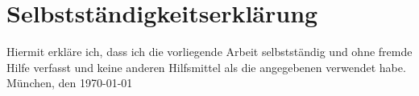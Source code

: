 \chapter*{Selbstständigkeitserklärung}

Hiermit erkläre ich, dass ich die vorliegende Arbeit selbstständig und ohne fremde Hilfe verfasst und keine anderen Hilfsmittel als die angegebenen verwendet habe. 
\newline
\newline
München, den \today
